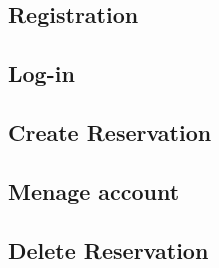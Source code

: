 \newpage
\subsection{Registration}
  

\newpage
\subsection{Log-in}
  

\newpage
\subsection{Create Reservation}
  
  
\newpage

\subsection{Menage account}
  
  
\newpage
\subsection{Delete Reservation}
  

